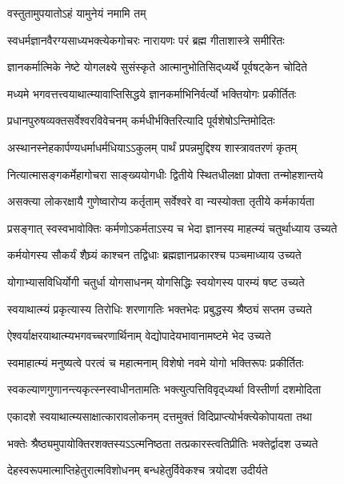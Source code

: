 
{वस्तुतामुपयातोऽहं यामुनेयं नमामि तम्}

\twolineshloka
{स्वधर्मज्ञानवैरग्यसाध्यभक्त्येकगोचरः}
{नारायणः परं ब्रह्म गीताशास्त्रे समीरितः}

\twolineshloka
{ज्ञानकर्मात्मिके नेष्टे योगलक्ष्ये सुसंस्कृते}
{आत्मानुभोतिसिद्‌ध्यर्थे पूर्वषट्केन चोदिते}

\twolineshloka
{मध्यमे भगवत्तत्त्वयाथात्म्यावाप्तिसिद्धये}
{ज्ञानकर्माभिनिर्वर्त्यो भक्तियोगः प्रकीर्तितः}

\twolineshloka
{प्रधानपुरुषव्यक्तसर्वेश्वरविवेचनम्}
{कर्मधीर्भक्तिरित्यादि पूर्वशेषोऽन्तिमोदितः}

\twolineshloka
{अस्थानस्नेहकार्पण्यधर्माधर्मधियाऽऽकुलम्}
{पार्थं प्रपन्नमुद्दिश्य शास्त्रावतरणं कृतम्}

\twolineshloka
{नित्यात्मासङ्गकर्मेहागोचरा साङ्ख्ययोगधीः}
{द्वितीये स्थितधीलक्षा प्रोक्ता तन्मोहशान्तये}

\twolineshloka
{असक्त्या लोकरक्षायै गुणेष्वारोप्य कर्तृताम्}
{सर्वेश्वरे वा न्यस्योक्ता तृतीये कर्मकार्यता}

\twolineshloka
{प्रसङ्गात् स्वस्वभावोक्तिः कर्मणोऽकर्मताऽस्य च}
{भेदा ज्ञानस्य माहत्म्यं चतुर्थाध्याय उच्यते}

\twolineshloka
{कर्मयोगस्य सौकर्यं शैघ्र्यं काश्चन तद्विधाः}
{ब्रह्मज्ञानप्रकारश्च पञ्चमाध्याय उच्यते}

\twolineshloka
{योगाभ्यासविधिर्योगी चतुर्धा योगसाधनम्}
{योगसिद्धिः स्वयोगस्य पारम्यं षष्ट उच्यते}

\twolineshloka
{स्वयाथात्म्यं प्रकृत्यास्य तिरोधिः शरणागतिः}
{भक्तभेदः प्रबुद्धस्य श्रैष्ठ्यं सप्तम उच्यते}

\twolineshloka
{ऐश्वर्याक्षरयाथात्म्यभगवच्चरणार्थिनाम्}
{वेद्योपादेयभावानामष्टमे भेद उच्यते}

\twolineshloka
{स्वमाहात्म्यं मनुष्यत्वे परत्वं च महात्मनाम्}
{विशेषो नवमे योगो भक्तिरूपः प्रकीर्तितः}

\twolineshloka
{स्वकल्याणगुणानन्त्यकृत्स्नस्वाधीनतामतिः}
{भक्त्युत्पत्तिविवृद्‌ध्यर्था विस्तीर्णा दशमोदिता}

\twolineshloka
{एकादशे स्वयाथात्म्यसाक्षात्कारावलोकनम्}
{दत्तमुक्तं विदिप्राप्त्योर्भक्त्येकोपायता तथा}

\twolineshloka
{भक्तेः श्रैष्ठ्यमुपायोक्तिरशक्तस्यऽऽत्मनिष्ठता}
{तत्प्रकारस्त्वतिप्रीतिः भक्तेर्द्वादश उच्यते}

\twolineshloka
{देहस्वरूपमात्माप्तिहेतुरात्मविशोधनम्}
{बन्धहेतुर्विवेकश्च त्रयोदश उदीर्यते}

